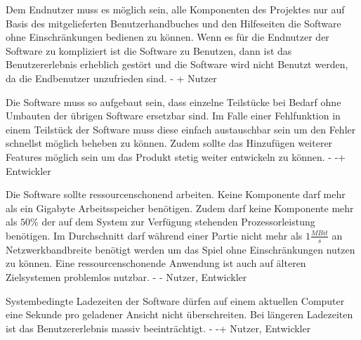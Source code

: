         {Dem Endnutzer muss es möglich sein, alle Komponenten des Projektes nur auf Basis des mitgelieferten Benutzerhandbuches und den Hilfeseiten die Software ohne Einschränkungen bedienen zu können.}
        {Wenn es für die Endnutzer der Software zu kompliziert ist die Software zu Benutzen, dann ist das Benutzererlebnis erheblich gestört und die Software wird nicht Benutzt werden, da die Endbenutzer unzufrieden sind.}
        {-}
        {+}
        {Nutzer}
        
        {Die Software muss so aufgebaut sein, dass einzelne Teilstücke bei Bedarf ohne Umbauten der übrigen Software ersetzbar sind.}
        {Im Falle einer Fehlfunktion in einem Teilstück der Software muss diese einfach austauschbar sein um den Fehler schnellst möglich beheben zu können. Zudem sollte das Hinzufügen weiterer Features möglich sein um das Produkt stetig weiter entwickeln zu können.}
        {-}
        {-+}
        {Entwickler}

        {Die Software sollte ressourcenschonend arbeiten. Keine Komponente darf mehr als ein Gigabyte Arbeitsspeicher benötigen. Zudem darf keine Komponente mehr als $50\%$ der auf dem System zur Verfügung stehenden Prozessorleistung benötigen. Im Durchschnitt darf während einer Partie nicht mehr als $1\frac{MBit}{s}$ an Netzwerkbandbreite benötigt werden um das Spiel ohne Einschränkungen nutzen zu können.}
        {Eine ressourcenschonende Anwendung ist auch auf älteren Zielsystemen problemlos nutzbar.}
        {-}
        {-}
        {Nutzer, Entwickler}

        {Systembedingte Ladezeiten der Software dürfen auf einem aktuellen Computer eine Sekunde pro geladener Ansicht nicht überschreiten.}
        {Bei längeren Ladezeiten ist das Benutzererlebnis massiv beeinträchtigt.}
        {-}
        {-+}
        {Nutzer, Entwickler}
